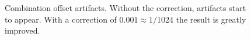 \begin{figure}
\centering
{}
\caption{Combination offset artifacts. Without the correction, artifacts start to appear. With a correction of $0.001 \approx 1 / 1024$ the result is greatly improved.}
\label{fig:shadowbias}
\end{figure}